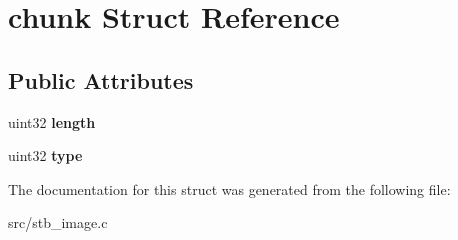 \hypertarget{structchunk}{}\section{chunk Struct Reference}
\label{structchunk}
\subsection*{Public Attributes}
\begin{DoxyCompactItemize}
\item 
\hypertarget{structchunk_a0b5cc0c5a9b91945c42373db2a499fb1}{}uint32 {\bfseries length}\label{structchunk_a0b5cc0c5a9b91945c42373db2a499fb1}

\item 
\hypertarget{structchunk_a05d5489f3807bc7ba149c1904241d087}{}uint32 {\bfseries type}\label{structchunk_a05d5489f3807bc7ba149c1904241d087}

\end{DoxyCompactItemize}


The documentation for this struct was generated from the following file\+:\begin{DoxyCompactItemize}
\item 
src/stb\+\_\+image.\+c\end{DoxyCompactItemize}
